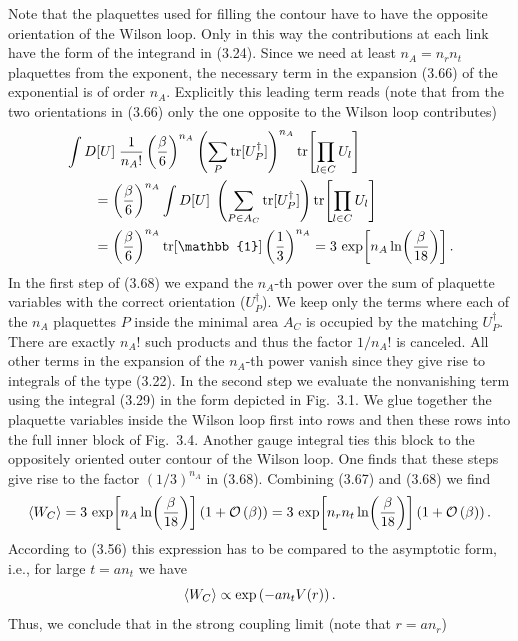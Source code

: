 Note that the plaquettes used for filling the contour have to have the opposite
orientation of the Wilson loop. Only in this way the contributions at each link
have the form of the integrand in (3.24). Since we need at least
$n_A = n_r n_t$ plaquettes from the exponent, the necessary term in the
expansion (3.66) of the exponential is of order $n_A$. Explicitly this leading
term reads (note that from the two orientations in (3.66) only the one opposite
to the Wilson loop contributes)
\begin{equation}
\begin{split}
  &\int D[U]\;\frac{1}{n_A!}\left(\frac{\beta}{6}\right)^{n_A}
    \left(\sum_P \tr[U_P^\dagger]\right)^{n_A}
    \tr\!\left[\prod_{l\in C} U_l\right] \\
  &\qquad = \left(\frac{\beta}{6}\right)^{n_A}\int D[U]\;
    \left(\sum_{P\in A_C} \tr[U_P^\dagger]\right)
    \tr\!\left[\prod_{l\in C} U_l\right] \\
  &\qquad = \left(\frac{\beta}{6}\right)^{n_A}\tr[\mathbb{1}]
    \left(\frac{1}{3}\right)^{n_A}
  = 3\,\exp\!\left[n_A \ln\!\left(\frac{\beta}{18}\right)\right] .
\end{split}
\end{equation}
In the first step of (3.68) we expand the $n_A$-th power over the sum of
plaquette variables with the correct orientation ($U_P^\dagger$). We keep only
the terms where each of the $n_A$ plaquettes $P$ inside the minimal area $A_C$
is occupied by the matching $U_P^\dagger$. There are exactly $n_A!$ such
products and thus the factor $1/n_A!$ is canceled. All other terms in the
expansion of the $n_A$-th power vanish since they give rise to integrals of the
type (3.22). In the second step we evaluate the nonvanishing term using the
integral (3.29) in the form depicted in Fig.~3.1. We glue together the
plaquette variables inside the Wilson loop first into rows and then these rows
into the full inner block of Fig.~3.4. Another gauge integral ties this block
to the oppositely oriented outer contour of the Wilson loop. One finds that
these steps give rise to the factor $(1/3)^{n_A}$ in (3.68). Combining (3.67)
and (3.68) we find
\begin{equation}
  \left\langle W_C \right\rangle = 3\,\exp\!\left[n_A \ln\!\left(\frac{\beta}{18}\right)\right]
    \left(1 + \mathcal{O}\left(\beta\right)\right)
  = 3\,\exp\!\left[n_r n_t \ln\!\left(\frac{\beta}{18}\right)\right]
    \left(1 + \mathcal{O}\left(\beta\right)\right) .
\end{equation}
According to (3.56) this expression has to be compared to the asymptotic form,
i.e., for large $t = a n_t$ we have
\begin{equation}
  \left\langle W_C \right\rangle \propto \exp\left(-a n_t V(r)\right) .
\end{equation}
Thus, we conclude that in the strong coupling limit (note that $r = a n_r$)

